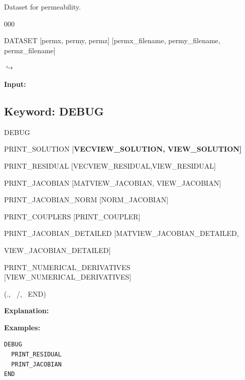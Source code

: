 \documentclass[12pt]{article}
\newcommand\keyend{{(., \, /, \, END)}}
\newcommand\return{{\hfill$\hookrightarrow$}}
\begin{document}

 Dataset for permeability.

\begin{deflist}{000}
\item[DATASET] [permx, permy, permz] [permx\_filename, permy\_filename, permz\_filename]
\end{deflist}

\hyperlink{target_key}{\return}


\newpage
\protect\hypertarget{target_dbg}{}

{\noindent\bf Input:}

\subsection{Keyword: DEBUG}
\begin{deflist}{00}
\item[DEBUG]~
\begin{deflist}{00}
\item[PRINT\_SOLUTION] [\bf VECVIEW\_SOLUTION, VIEW\_SOLUTION]
\item[PRINT\_RESIDUAL] [VECVIEW\_RESIDUAL,VIEW\_RESIDUAL]
\item[PRINT\_JACOBIAN] [MATVIEW\_JACOBIAN, VIEW\_JACOBIAN]
\item[PRINT\_JACOBIAN\_NORM] [NORM\_JACOBIAN]
\item[PRINT\_COUPLERS] [PRINT\_COUPLER]
\item[PRINT\_JACOBIAN\_DETAILED] [MATVIEW\_JACOBIAN\_DETAILED, 

VIEW\_JACOBIAN\_DETAILED]

\item[PRINT\_NUMERICAL\_DERIVATIVES] [VIEW\_NUMERICAL\_DERIVATIVES]

\end{deflist}
\item[\keyend]
\end{deflist}

{\noindent\bf Explanation:}

\bigskip

{\noindent\bf Examples:}
\begin{verbatim}
DEBUG
  PRINT_RESIDUAL
  PRINT_JACOBIAN
END
\end{verbatim}
\end{document}
